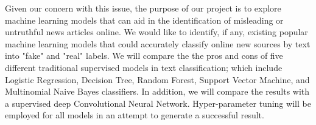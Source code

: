 \documentclass[10pt,twocolumn,letterpaper]{article}
\begin{document}
Given our concern with this issue, the purpose of our project is to explore machine learning models that can aid in the identification of misleading or untruthful news articles online. We would like to identify, if any, existing popular machine learning models that could accurately classify online new sources by text into "fake" and "real" labels. We will compare the the pros and cons of five different traditional supervised models in text classification; which include Logistic Regression, Decision Tree, Random Forest, Support Vector Machine, and Multinomial Naive Bayes classifiers. In addition, we will compare the results with a supervised deep Convolutional Neural Network. Hyper-parameter tuning will be employed for all models in an attempt to generate a successful result.\par
\end{document}
